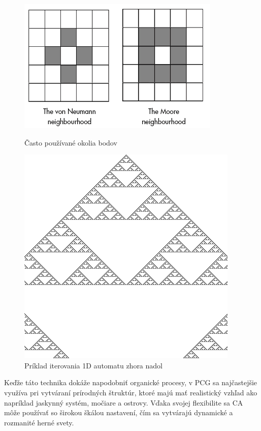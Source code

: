\begin{figure}[H]
    \centering
    \begin{minipage}[c]{0.45\linewidth}
        \centering
        \includegraphics[width=0.8\linewidth]{obrazky-figures/ca-neighbourhood.png}
        \caption{Často používané okolia bodov}
        \label{fig:ca-neighbours}
    \end{minipage}
    \hfill
    \begin{minipage}[c]{0.45\linewidth}
        \centering
        \includegraphics[width=0.6\linewidth]{obrazky-figures/ca-pattern.png}
        \caption{Príklad iterovania 1D automatu zhora nadol}
        \label{fig:ca-iterations}
    \end{minipage}
\end{figure}

Keďže táto technika dokáže napodobniť organické procesy, v PCG sa najčastejšie využíva pri vytváraní prírodných štruktúr, ktoré majú mať realistický vzhľad ako napríklad jaskynný systém, močiare a ostrovy. Vďaka svojej flexibilite sa CA môže používať so širokou škálou nastavení, čím sa vytvárajú dynamické a rozmanité herné svety.

